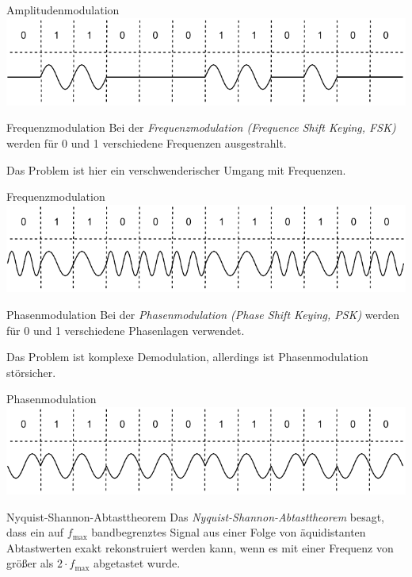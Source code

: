 \begin{example}{Amplitudenmodulation}
    \centering
    \includegraphics[width=.9\textwidth]{includes/figures/example_amplitudenmodulation.pdf}
\end{example}

\begin{defi}{Frequenzmodulation}
    Bei der \emph{Frequenzmodulation (Frequence Shift Keying, FSK)} werden für 0 und 1 verschiedene Frequenzen ausgestrahlt.

    Das Problem ist hier ein verschwenderischer Umgang mit Frequenzen.
\end{defi}

\begin{example}{Frequenzmodulation}
    \centering
    \includegraphics[width=.9\textwidth]{includes/figures/example_frequenzmodulation.pdf}
\end{example}

\begin{defi}{Phasenmodulation}
    Bei der \emph{Phasenmodulation (Phase Shift Keying, PSK)} werden für 0 und 1 verschiedene Phasenlagen verwendet.

    Das Problem ist komplexe Demodulation, allerdings ist Phasenmodulation störsicher.
\end{defi}

\begin{example}{Phasenmodulation}
    \centering
    \includegraphics[width=.9\textwidth]{includes/figures/example_phasenmodulation.pdf}
\end{example}

\begin{defi}{Nyquist-Shannon-Abtasttheorem}
    Das \emph{Nyquist-Shannon-Abtasttheorem} besagt, dass ein auf $f_{\text{max}}$ bandbegrenztes Signal aus einer Folge von äquidistanten Abtastwerten exakt rekonstruiert werden kann, wenn es mit einer Frequenz von größer als $2 \cdot f_{\text{max}}$ abgetastet wurde.
\end{defi}


